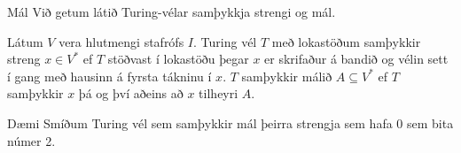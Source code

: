 \documentclass{beamer}
\begin{document}
\begin{frame}{Mál}
Við getum látið Turing-vélar samþykkja strengi og mál.

\begin{tcolorbox}
Látum $V$ vera hlutmengi stafrófs $I$. Turing vél $T$ með lokastöðum samþykkir streng $x \in V^*$ ef $T$ stöðvast í lokastöðu þegar $x$ er skrifaður á bandið og vélin sett í gang með hausinn á fyrsta tákninu í $x$. $T$ samþykkir málið $A \subseteq V^*$ ef $T$ samþykkir $x$ þá og því aðeins að $x$ tilheyri $A$.
\end{tcolorbox}

\end{frame}

\begin{frame}{Dæmi}
Smíðum Turing vél sem samþykkir mál þeirra strengja sem hafa $0$ sem bita númer 2.
\begin{center}
\end{center}
\end{frame}
\end{document}
